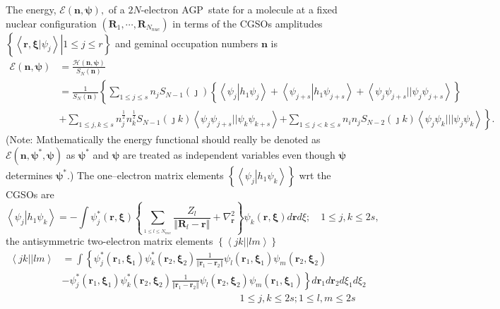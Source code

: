 \documentclass[aps,preprint]{revtex4}%
\begin{document}
The energy, $\mathcal{E}\left(  \bm{n,\psi}\right)  ,$ of a $2N$-electron
AGP\ state for a molecule at a fixed nuclear configuration $\left(
\bm{R}_{1},\cdots,\bm{R}_{N_{nuc}}\right)  $ in terms of the CGSOs amplitudes
$\left\{  \left.  \left\langle \left.  \bm{r,\xi}\right\vert \psi
_{j}\right\rangle \right\vert 1\leq j\leq r\right\}  $ and geminal occupation
numbers $\bm{n}$ is
\begin{align}
\mathcal{E}\left(  \bm{n,\psi}\right)   &  =\frac{\mathcal{H}\left(
\bm{n,\psi}\right)  }{S_{N}\left(  \bm{n}\right)  }\nonumber\\
&  =\frac{1}{S_{N}\left(  \bm{n}\right)  }\left\{  \sum_{1\leq j\leq s}%
n_{j}S_{N-1}\left(  \jmath\right)  \left\{  \left\langle \psi_{j}\left\vert
h_{1}\psi_{j}\right.  \right\rangle +\left\langle \psi_{j+s}\left\vert
h_{1}\psi_{j+s}\right.  \right\rangle +\left\langle \psi_{j}\psi_{j+s}%
||\psi_{j}\psi_{j+s}\right\rangle \right\}  \right. \nonumber\\
&  +\sum_{1\leq j,k\leq s}n_{j}^{\frac{1}{2}}n_{k}^{\frac{1}{2}}S_{N-1}\left(
\jmath k\right)  \left\langle \psi_{j}\psi_{j+s}||\psi_{k}\psi_{k+s}%
\right\rangle \left.  +\sum_{1\leq j<k\leq s}n_{i}n_{j}S_{N-2}\left(  \jmath
k\right)  \left\langle \psi_{j}\psi_{k}|||\psi_{j}\psi_{k}\right\rangle
\right\}  . \label{energy}%
\end{align}
(Note: Mathematically the energy functional should really be denoted as
$\mathcal{E}\left(  \bm{n,\psi}^{\ast}\bm{,\psi}\right)  $ as $\bm{\psi}^{\ast
}$ and $\bm{\psi}$ are treated as independent variables even though
$\bm{\psi}$ determines $\bm{\psi}^{\ast}$.) The one--electron matrix elements
$\left\{  \left\langle \psi_{j}\left\vert h_{1}\psi_{k}\right.  \right\rangle
\right\}  $ wrt the CGSOs are
\begin{equation}
\left\langle \psi_{j}\left\vert h_{1}\psi_{k}\right.  \right\rangle =-\int
\psi_{j}^{\ast}\left(  \bm{r,\xi}\right)  \left\{  \sum_{_{1\leq l\leq
N_{nuc}}}\frac{Z_{l}}{\left\Vert \bm{R}_{l}-\bm{r}\right\Vert }+\nabla
_{\bm{r}}^{2}\right\}  \psi_{k}\left(  \bm{r,\xi}\right)  d\bm{r}d\xi
;\quad1\leq j,k\leq2s, \label{h1}%
\end{equation}
the antisymmetric two-electron matrix elements $\left\{  \left\langle
jk||lm\right\rangle \right\}  $
\begin{align}
\left\langle jk||lm\right\rangle  &  =\int\left\{  \psi_{j}^{\ast}\left(
\bm{r}_{1}\bm{,\xi}_{1}\right)  \psi_{k}^{\ast}\left(  \bm{r}_{2}%
\bm{,\xi}_{2}\right)  \frac{1}{\left\Vert \bm{r}_{1}-\bm{r}_{2}\right\Vert
}\psi_{l}\left(  \bm{r}_{1}\bm{,\xi}_{1}\right)  \psi_{m}\left(
\bm{r}_{2}\bm{,\xi}_{2}\right)  \right. \nonumber\\
&  -\left.  \psi_{j}^{\ast}\left(  \bm{r}_{1}\bm{,\xi}_{1}\right)  \psi
_{k}^{\ast}\left(  \bm{r}_{2}\bm{,\xi}_{2}\right)  \frac{1}{\left\Vert
\bm{r}_{1}-\bm{r}_{2}\right\Vert }\psi_{l}\left(  \bm{r}_{2}\bm{,\xi}_{2}%
\right)  \psi_{m}\left(  \bm{r}_{1}\bm{,\xi}_{1}\right)  \right\}
d\bm{r}_{1}d\bm{r}_{2}d\xi_{1}d\xi_{2}\nonumber\\
&  \left.  {}\right.  \qquad\qquad\qquad\qquad\qquad\qquad\qquad\qquad
\qquad1\leq j,k\leq2s;1\leq l,m\leq2s \label{h2}%
\end{align}
\end{document}
